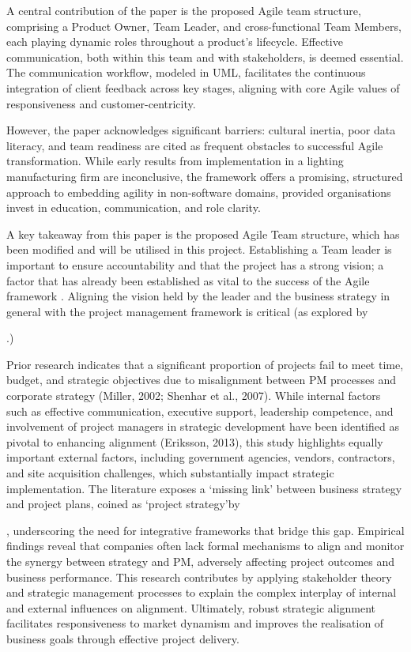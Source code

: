 \documentclass{report}
\begin{document}
A central contribution of the paper is the proposed Agile team structure, comprising a Product Owner, Team Leader, and cross-functional Team Members, each playing dynamic roles throughout a product's lifecycle. 
Effective communication, both within this team and with stakeholders, is deemed essential. 
The communication workflow, modeled in UML, facilitates the continuous integration of client feedback across key stages, aligning with core Agile values of responsiveness and customer-centricity.

However, the paper acknowledges significant barriers: cultural inertia, poor data literacy, and team readiness are cited as frequent obstacles to successful Agile transformation. 
While early results from implementation in a lighting manufacturing firm are inconclusive, the framework offers a promising, structured approach to embedding agility in non-software domains, provided organisations invest in education, communication, and role clarity.

A key takeaway from this paper is the proposed Agile Team structure, which has been modified and will be utilised in this project. 
Establishing a Team leader is important to ensure accountability and that the project has a strong vision; a factor that has already been established as vital to the success of the Agile framework \parencite{serradorDoesAgileWork2015}. 
Aligning the vision held by the leader and the business strategy in general with the project management framework is critical (as explored by \author{alsudiriAlignmentLargeProject2013}.) 

Prior research indicates that a significant proportion of projects fail to meet time, budget, and strategic objectives due to misalignment between PM processes and corporate strategy (Miller, 2002; Shenhar et al., 2007). 
While internal factors such as effective communication, executive support, leadership competence, and involvement of project managers in strategic development have been identified as pivotal to enhancing alignment (Eriksson, 2013), this study highlights equally important external factors, including government agencies, vendors, contractors, and site acquisition challenges, which substantially impact strategic implementation. 
The literature exposes a `missing link' between business strategy and project plans, coined as `project strategy'by \author{shenharLinkingProjectManagement2007}, underscoring the need for integrative frameworks that bridge this gap. 
Empirical findings reveal that companies often lack formal mechanisms to align and monitor the synergy between strategy and PM, adversely affecting project outcomes and business performance. 
This research contributes by applying stakeholder theory and strategic management processes to explain the complex interplay of internal and external influences on alignment. 
Ultimately, robust strategic alignment facilitates responsiveness to market dynamism and improves the realisation of business goals through effective project delivery.
\end{document}
